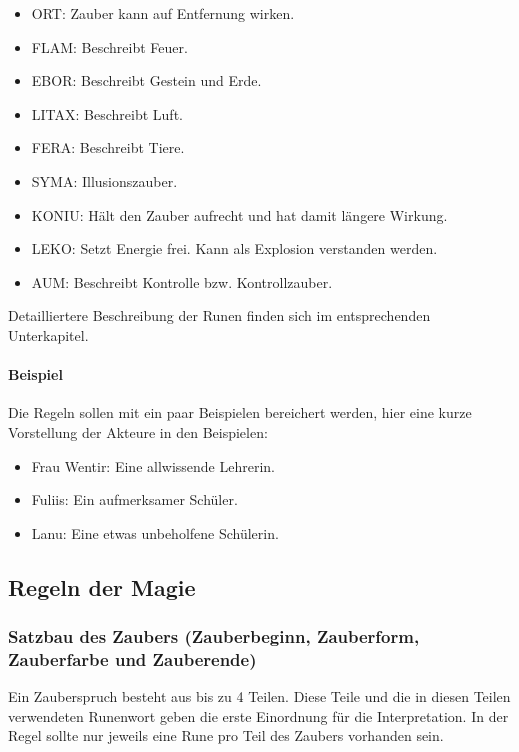 \documentclass{article}
\begin{document}
\begin{itemize}
\item ORT: Zauber kann auf Entfernung wirken.
\item FLAM: Beschreibt Feuer.
\item EBOR: Beschreibt Gestein und Erde.
\item LITAX: Beschreibt Luft.
\item FERA: Beschreibt Tiere.
\item SYMA: Illusionszauber.
\item KONIU: Hält den Zauber aufrecht und hat damit längere Wirkung.
\item LEKO: Setzt Energie frei. Kann als Explosion verstanden werden.
\item AUM: Beschreibt Kontrolle bzw. Kontrollzauber.
\end{itemize}

Detailliertere Beschreibung der Runen finden sich im entsprechenden Unterkapitel.

\paragraph{Beispiel}

Die Regeln sollen mit ein paar Beispielen bereichert werden, hier eine kurze Vorstellung der Akteure in den Beispielen:

\begin{itemize}
\item Frau Wentir: Eine allwissende Lehrerin.
\item Fuliis: Ein aufmerksamer Schüler.
\item Lanu: Eine etwas unbeholfene Schülerin.
\end{itemize}

\begin{center}
\subsection{Regeln der Magie}
\end{center}

\subsubsection{Satzbau des Zaubers (Zauberbeginn, Zauberform, Zauberfarbe und Zauberende)}

Ein Zauberspruch besteht aus bis zu 4 Teilen. Diese Teile und die in diesen Teilen verwendeten Runenwort geben die erste
Einordnung für die Interpretation. In der Regel sollte nur jeweils eine Rune pro Teil des Zaubers vorhanden sein.
\end{document}
